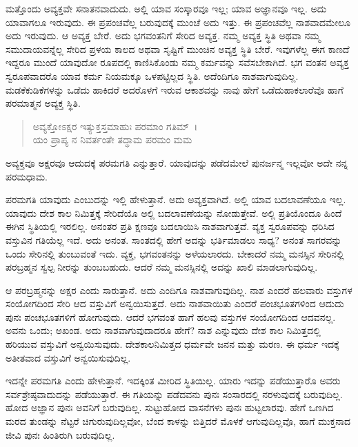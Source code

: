 ಮತ್ತೊಂದು ಅವ್ಯಕ್ತವೇ ಸನಾತನವಾದುದು. ಅಲ್ಲಿ ಯಾವ ಸಂಸ್ಕಾರವೂ ಇಲ್ಲ; ಯಾವ ಅಜ್ಞಾನವೂ ಇಲ್ಲ. ಅದು ಯಾವಾಗಲೂ ಇರುವುದು. ಈ ಪ್ರಪಂಚವೆಲ್ಲ ಬರುವುದಕ್ಕೆ ಮುಂಚೆ ಅದು ಇತ್ತು. ಈ ಪ್ರಪಂಚವೆಲ್ಲ ನಾಶವಾದಮೇಲೂ ಅದು ಇರುವುದು. ಆ ಅವ್ಯಕ್ತ ಬೇರೆ. ಅದು ಭಗವಂತನಿಗೆ ಸೇರಿದ ಅವ್ಯಕ್ತ. ನಮ್ಮ ಅವ್ಯಕ್ತ ಸ್ಥಿತಿ ಅಥವಾ ನಮ್ಮ ಸಮುದಾಯವನ್ನೆಲ್ಲ ಸೇರಿದ ಪ್ರಳಯ ಕಾಲದ ಅಥವಾ ಸೃಷ್ಟಿಗೆ ಮುಂಚಿನ ಅವ್ಯಕ್ತ ಸ್ಥಿತಿ ಬೇರೆ. ಇವುಗಳೆಲ್ಲ ಈಗ ಕಾಣದೆ ಇದ್ದರೂ ಮುಂದೆ ಯಾವುದೋ ರೂಪದಲ್ಲಿ ಕಾಣಿಸಿಕೊಂಡು ನಮ್ಮ ಕರ್ಮವನ್ನು ಸವೆಸಬೇಕಾಗಿದೆ. ಭಗ ವಂತನ ಅವ್ಯಕ್ತ ಸ್ವರೂಪವಾದರೊ ಯಾವ ಕರ್ಮ ನಿಯಮಕ್ಕೂ ಒಳಪಟ್ಟಿಲ್ಲದ ಸ್ಥಿತಿ. ಅದೆಂದಿಗೂ ನಾಶವಾಗುವುದಿಲ್ಲ. ಮಡಕೆಕುಡಿಕೆಗಳನ್ನು ಒಡೆದು ಹಾಕಿದರೆ ಅದರೊಳಗೆ ಇರುವ ಆಕಾಶವನ್ನು ನಾವು ಹೇಗೆ ಒಡೆದುಹಾಕಲಾರೆವೊ ಹಾಗೆ ಪರಮಾತ್ಮನ ಅವ್ಯಕ್ತ ಸ್ಥಿತಿ.

\begin{verse}
ಅವ್ಯಕ್ತೋಽಕ್ಷರ ಇತ್ಯುಕ್ತಸ್ತಮಾಹುಃ ಪರಮಾಂ ಗತಿಮ್~।\\ಯಂ ಪ್ರಾಪ್ಯ ನ ನಿವರ್ತಂತೇ ತದ್ಧಾಮ ಪರಮಂ ಮಮ 
\end{verse}

{\small ಅವ್ಯಕ್ತವೂ ಅಕ್ಷರವೂ ಆದುದಕ್ಕೆ ಪರಮಗತಿ ಎನ್ನುತ್ತಾರೆ. ಯಾವುದನ್ನು ಪಡೆದಮೇಲೆ ಪುನರ್ಜನ್ಮ ಇಲ್ಲವೋ ಅದೇ ನನ್ನ ಪರಮಧಾಮ.}

ಪರಮಗತಿ ಯಾವುದು ಎಂಬುದನ್ನು ಇಲ್ಲಿ ಹೇಳುತ್ತಾನೆ. ಅದು ಅವ್ಯಕ್ತವಾಗಿದೆ. ಅಲ್ಲಿ ಯಾವ ಬದಲಾವಣೆಯೂ ಇಲ್ಲ. ಯಾವುದು ದೇಶ ಕಾಲ ನಿಮಿತ್ತಕ್ಕೆ ಸೇರಿದೆಯೊ ಅಲ್ಲಿ ಬದಲಾವಣೆಯನ್ನು ನೋಡುತ್ತೇವೆ. ಅಲ್ಲಿ ಪ್ರತಿಯೊಂದೂ ಹಿಂದೆ ಈಗಿನ ಸ್ಥಿತಿಯಲ್ಲಿ ಇರಲಿಲ್ಲ. ಅನಂತರ ಪ್ರತಿ ಕ್ಷಣವೂ ಬದಲಾಯಿಸಿ ನಾಶವಾಗುತ್ತವೆ. ವ್ಯಕ್ತ ಸ್ವರೂಪವನ್ನು ಧರಿಸಿದ ವಸ್ತುವಿನ ಗತಿಯೆಲ್ಲ ಇದೆ. ಅದು ಅನಂತ. ಸಾಂತದಲ್ಲಿ ಹೇಗೆ ಅದನ್ನು ಭರ್ತಿಮಾಡಲು ಸಾಧ್ಯ? ಅನಂತ ಸಾಗರವನ್ನು ಒಂದು ಸೇರಿನಲ್ಲಿ ತುಂಬುವಂತೆ ಇದು. ವ್ಯಕ್ತ, ಭಗವಂತನನ್ನು ಅಳೆಯಲಾರದು. ಬೇಕಾದರೆ ನಮ್ಮ ಮನಸ್ಸಿನ ಸೇರಿನಲ್ಲಿ ಪರಬ್ರಹ್ಮನ ಸ್ವಲ್ಪ ನೀರನ್ನು ತುಂಬಬಹುದು. ಆದರೆ ನಮ್ಮ ಮನಸ್ಸಿನಲ್ಲಿ ಅದನ್ನು ಖಾಲಿ ಮಾಡಲಾಗುವುದಿಲ್ಲ.

ಆ ಪರಬ್ರಹ್ಮನನ್ನು ಅಕ್ಷರ ಎಂದು ಸಾರುತ್ತಾನೆ. ಅದು ಎಂದಿಗೂ ನಾಶವಾಗುವುದಿಲ್ಲ. ನಾಶ ಎಂದರೆ ಹಲವಾರು ವಸ್ತುಗಳ ಸಂಯೋಗದಿಂದ ಸೇರಿ ಆದ ವಸ್ತುವಿಗೆ ಅನ್ವಯಿಸುತ್ತದೆ. ಅದು ನಾಶವಾಯಿತು ಎಂದರೆ ಪಂಚಭೂತಗಳಿಂದ ಆದುದು ಪುನಃ ಪಂಚಭೂತಗಳಿಗೆ ಹೋಗುವುದು. ಆದರೆ ಭಗವಂತ ಹಾಗೆ ಹಲವು ವಸ್ತುಗಳ ಸಂಯೋಗದಿಂದ ಆದವನಲ್ಲ. ಅವನು ಒಂದು; ಅಖಂಡ. ಅದು ನಾಶವಾಗುವುದಾದರೂ ಹೇಗೆ? ನಾಶ ಎನ್ನುವುದು ದೇಶ ಕಾಲ ನಿಮಿತ್ತದಲ್ಲಿ ಹರಿಯುವ ವಸ್ತುವಿಗೆ ಅನ್ವಯಿಸುವುದು. ದೇಶಕಾಲನಿಮಿತ್ತದ ಧರ್ಮವೇ ಜನನ ಮತ್ತು ಮರಣ. ಈ ಧರ್ಮ ಇದಕ್ಕೆ ಅತೀತವಾದ ವಸ್ತುವಿಗೆ ಅನ್ವಯಿಸುವುದಿಲ್ಲ.

ಇದನ್ನೇ ಪರಮಗತಿ ಎಂದು ಹೇಳುತ್ತಾನೆ. ಇದಕ್ಕಿಂತ ಮೀರಿದ ಸ್ಥಿತಿಯಿಲ್ಲ. ಯಾರು ಇದನ್ನು ಪಡೆಯುತ್ತಾರೊ ಅವರು ಸರ್ವಶ್ರೇಷ್ಠವಾದುದನ್ನು ಪಡೆಯುತ್ತಾರೆ. ಈ ಗತಿಯನ್ನು ಪಡೆದವನು ಪುನಃ ಸಂಸಾರದಲ್ಲಿ ನರಳುವುದಕ್ಕೆ ಬರುವುದಿಲ್ಲ. ಹೋದ ಅಜ್ಞಾನ ಪುನಃ ಅವನಿಗೆ ಬರುವುದಿಲ್ಲ. ಸುಟ್ಟುಹೋದ ವಾಸನೆಗಳು ಪುನಃ ಹುಟ್ಟಲಾರವು. ಹೇಗೆ ಒಣಗಿದ ಮರದ ತುಂಡನ್ನು ನೆಟ್ಟರೆ ಚಿಗುರುವುದಿಲ್ಲವೋ, ಬೆಂದ ಕಾಳನ್ನು ಬಿತ್ತಿದರೆ ಮೊಳಕೆ ಆಗುವುದಿಲ್ಲವೊ, ಹಾಗೆ ಮುಕ್ತನಾದ ಜೀವಿ ಪುನಃ ಹಿಂತಿರುಗಿ ಬರುವುದಿಲ್ಲ.

